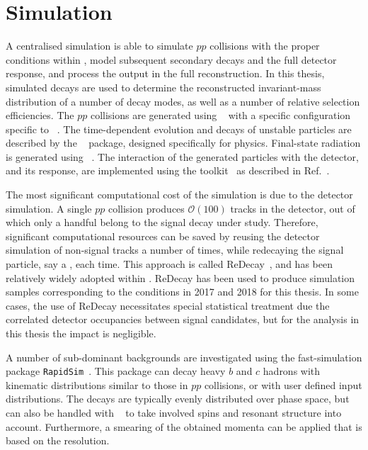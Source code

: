 



\section{Simulation} %
\label{sec:simulation}

A centralised \lhcb simulation is able to simulate $pp$ collisions with the proper conditions within \lhcb, model subsequent secondary decays and the full detector response, and process the output in the full \lhcb reconstruction. In this thesis, simulated decays are used to determine the reconstructed invariant-mass distribution of a number of decay modes, as well as a number of relative selection efficiencies. The $pp$ collisions are generated using \pythia~\cite{Sjostrand:2007gs,*Sjostrand:2006za} with a specific configuration specific to \lhcb~\cite{LHCb-PROC-2010-056}. The time-dependent evolution and decays of unstable particles are described by the \evtgen~\cite{EvtGen} package, designed specifically for \B physics. Final-state radiation is generated using \photos~\cite{Golonka:2005pn}. The interaction of the generated particles with the detector, and its response, are implemented using the \geant toolkit~\cite{Allison:2006ve, *Agostinelli:2002hh} as described in  Ref.~\cite{LHCb-PROC-2011-006}. 

The most significant computational cost of the simulation is due to the detector simulation. A single $pp$ collision produces $\mathcal O(100)$ tracks in the detector, out of which only a handful belong to the signal decay under study. Therefore, significant computational resources can be saved by reusing the detector simulation of non-signal tracks a number of times, while redecaying the signal particle, say a \Bp, each time. This approach is called ReDecay~\cite{LHCb-DP-2018-004}, and has been relatively widely adopted within \lhcb. ReDecay has been used to produce simulation samples corresponding to the conditions in 2017 and 2018 for this thesis. In some cases, the use of ReDecay necessitates special statistical treatment due the correlated detector occupancies between signal candidates, but for the analysis in this thesis the impact is negligible.

A number of sub-dominant backgrounds are investigated using the fast-simulation package \texttt{RapidSim}~\cite{cowanRapidSimApplicationFast2017}. This package can decay heavy $b$ and $c$ hadrons with kinematic distributions similar to those in \lhcb $pp$ collisions, or with user defined input distributions. The decays are typically evenly distributed over phase space, but can also be handled with \evtgen~\cite{EvtGen} to take involved spins and resonant structure into account. Furthermore, a smearing of the obtained momenta can be applied that is based on the \lhcb resolution. 


